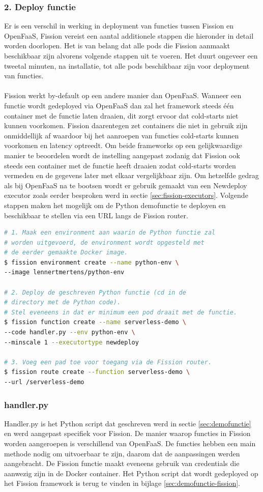 \subsubsection{2. Deploy functie}
Er is een verschil in werking in deployment van functies tussen Fission en OpenFaaS, Fission vereist een aantal additionele stappen die hieronder in detail worden doorlopen. Het is van belang dat alle pods die Fission aanmaakt beschikbaar zijn alvorens volgende stappen uit te voeren. Het duurt ongeveer een tweetal minuten, na installatie, tot alle pods beschikbaar zijn voor deployment van functies.
\\\\
Fission werkt by-default op een andere manier dan OpenFaaS. Wanneer een functie wordt gedeployed via OpenFaaS dan zal het framework steeds één container met de functie laten draaien, dit zorgt ervoor dat cold-starts niet kunnen voorkomen. Fission daarentegen zet containers die niet in gebruik zijn onmiddellijk af waardoor bij het aanroepen van functies cold-starts kunnen voorkomen en latency optreedt. Om beide frameworks op een gelijkwaardige manier te beoordelen wordt de instelling aangepast zodanig dat Fission ook steeds een container met de functie heeft draaien zodat cold-starts worden vermeden en de gegevens later met elkaar vergelijkbaar zijn. Om hetzelfde gedrag als bij OpenFaaS na te bootsen wordt er gebruik gemaakt van een Newdeploy executor zoals eerder besproken werd in sectie \ref{sec:fission-executors}. Volgende stappen maken het mogelijk om de Python demofunctie te deployen en beschikbaar te stellen via een URL langs de Fission router.

\begin{lstlisting}[language=bash]
# 1. Maak een environment aan waarin de Python functie zal 
# worden uitgevoerd, de environment wordt opgesteld met 
# de eerder gemaakte Docker image.
$ fission environment create --name python-env \
--image lennertmertens/python-env

# 2. Deploy de geschreven Python functie (cd in de 
# directory met de Python code).
# Stel eveneens in dat er minimum een pod draait met de functie.
$ fission function create --name serverless-demo \
--code handler.py --env python-env \
--minscale 1 --executortype newdeploy

# 3. Voeg een pad toe voor toegang via de Fission router.
$ fission route create --function serverless-demo \
--url /serverless-demo
\end{lstlisting}
 
\subsubsection{handler.py}
Handler.py is het Python script dat geschreven werd in sectie \ref{sec:demofunctie} en werd aangepast specifiek voor Fission. De manier waarop functies in Fission worden aangeroepen is verschillend van OpenFaaS. De functies hebben een main methode nodig om uitvoerbaar te zijn, daarom dat de aanpassingen werden aangebracht. De Fission functie maakt eveneens gebruik van credentials die aanwezig zijn in de Docker container. Het Python script dat wordt gedeployed op het Fission framework is terug te vinden in bijlage \ref{sec:demofunctie-fission}.

